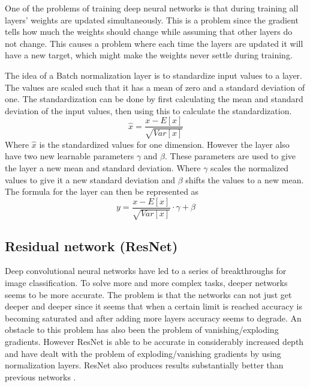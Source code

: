 One of the problems of training deep neural networks is that during training all layers' weights are updated simultaneously.
This is a problem since the gradient tells how much the weights should change while assuming that other layers do not change.
This causes a problem where each time the layers are updated it will have a new target, which might make the weights never settle during training.

The idea of a Batch normalization layer is to standardize input values to a layer.
The values are scaled such that it has a mean of zero and a standard deviation of one.
The standardization can be done by first calculating the mean and standard deviation of the input values, then using this to calculate the standardization.
$$\hat{x} = \frac{x - E[x]}{\sqrt{Var[x]}}$$
Where $\hat{x}$ is the standardized values for one dimension.
However the layer also have two new learnable parameters $\gamma$ and $\beta$.
These parameters are used to give the layer a new mean and standard deviation.
Where $\gamma$ scales the normalized values to give it a new standard deviation and $\beta$ shifts the values to a new mean.
The formula for the layer can then be represented as
$$y = \frac{x - E[x]}{\sqrt{Var[x]}} \cdot \gamma + \beta$$


\subsection{Residual network (ResNet)}

\guillemotleft Deep convolutional neural networks have led to a series of breakthroughs for image classification\guillemotright \cite{resnet}.
To solve more and more complex tasks, deeper networks seems to be more accurate.
The problem is that the networks can not just get deeper and deeper since it seems that when a certain limit is reached accuracy is becoming saturated and after adding more layers accuracy seems to degrade.
An obstacle to this problem has also been the problem of vanishing/exploding gradients.
However ResNet is able to be accurate in considerably increased depth and have dealt with the problem of exploding/vanishing gradients by using normalization layers. ResNet also produces results substantially better than previous networks \cite{resnet}.

